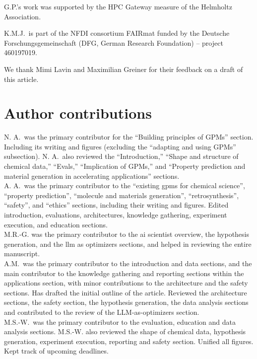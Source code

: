 \documentclass[11pt, oneside]{article}
\begin{document}
\noindent G.P.'s work was supported by the HPC Gateway measure of the Helmholtz Association.


\noindent K.M.J.\ is part of the NFDI consortium FAIRmat funded by the Deutsche Forschungsgemeinschaft (DFG, German Research Foundation) – project 460197019.

\noindent We thank Mimi Lavin and Maximilian Greiner for their feedback on a draft of this article.

\section*{Author contributions}
N. A.\ was the primary contributor for the \enquote{Building principles of GPMs} section. Including its writing and figures (excluding the \enquote{adapting and using GPMs} subsection). N. A.\ also reviewed the \enquote{Introduction,} \enquote{Shape and structure of chemical data,} \enquote{Evals,} \enquote{Implication of GPMs,} and \enquote{Property prediction and material generation in accelerating applications} sections. \\

\noindent A. A.\ was the primary contributor to the \enquote{existing \glspl{gpm} for chemical science}, \enquote{property prediction}, \enquote{molecule and materials generation}, \enquote{retrosynthesis}, \enquote{safety}, and \enquote{ethics} sections, including their writing and figures. Edited introduction, evaluations, architectures, knowledge gathering, experiment execution, and education sections. \\ 

\noindent M.R.-G. was the primary contributor to the \gls{ai} scientist overview, the hypothesis generation, and the \gls{llm} as optimizers sections, and helped in reviewing the entire manuscript. \\

\noindent A.M.\ was the primary contributor to the introduction and data sections, and the main contributor to the knowledge gathering and reporting sections within the applications section, with minor contributions to the architecture and the safety sections. Has drafted the initial outline of the article. Reviewed the architecture sections, the safety section, the hypothesis generation, the data analysis sections and contributed to the review of the LLM-as-optimizers section.\\

\noindent M.S.-W.\ was the primary contributor to the evaluation, education and data analysis sections. M.S.-W. also reviewed the shape of chemical data, hypothesis generation, experiment execution, reporting and safety section. Unified all figures. Kept track of upcoming deadlines. \\ 
\end{document}
